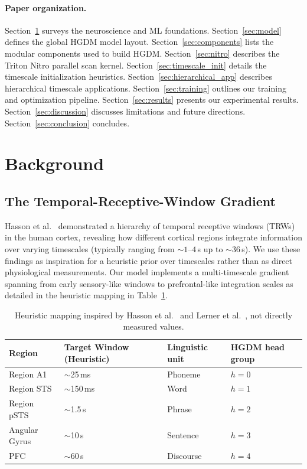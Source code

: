 \documentclass{article}
\begin{document}
\paragraph{Paper organization.}
Section~\ref{sec:background} surveys the neuroscience and ML foundations.
Section~\ref{sec:model} defines the global HGDM model layout.
Section~\ref{sec:components} lists the modular components used to build HGDM.
Section~\ref{sec:nitro} describes the Triton Nitro parallel scan kernel.
Section~\ref{sec:timescale_init} details the timescale initialization heuristics.
Section~\ref{sec:hierarchical_app} describes hierarchical timescale applications.
Section~\ref{sec:training} outlines our training and optimization pipeline.
Section~\ref{sec:results} presents our experimental results.
Section~\ref{sec:discussion} discusses limitations and future directions.
Section~\ref{sec:conclusion} concludes.

\section{Background}
\label{sec:background}

\subsection{The Temporal-Receptive-Window Gradient}

Hasson et al.\ \cite{hasson2008hierarchy,lerner2011trw} demonstrated a hierarchy of temporal receptive windows (TRWs) in the human cortex, revealing how different cortical regions integrate information over varying timescales (typically ranging from $\sim 1\text{--}4$\,s up to $\sim 36$\,s). We use these findings as inspiration for a heuristic prior over timescales rather than as direct physiological measurements. Our model implements a multi-timescale gradient spanning from early sensory-like windows to prefrontal-like integration scales as detailed in the heuristic mapping in Table~\ref{tab:trw}.

\begin{table}[!ht]
\centering
\caption{Heuristic mapping inspired by Hasson et al.\ \cite{hasson2008hierarchy} and Lerner et al.\ \cite{lerner2011trw}, not directly measured values.}
\label{tab:trw}
\begin{tabular}{llll}
\toprule
Region & Target Window (Heuristic) & Linguistic unit & HGDM head group \\
\midrule
Region A1     & $\sim$25\,ms & Phoneme   & $h{=}0$ \\
Region STS    & $\sim$150\,ms & Word     & $h{=}1$ \\
Region pSTS   & $\sim$1.5\,s & Phrase    & $h{=}2$ \\
Angular Gyrus & $\sim$10\,s  & Sentence  & $h{=}3$ \\
PFC           & $\sim$60\,s  & Discourse & $h{=}4$ \\
\bottomrule
\end{tabular}
\end{table}
\end{document}
